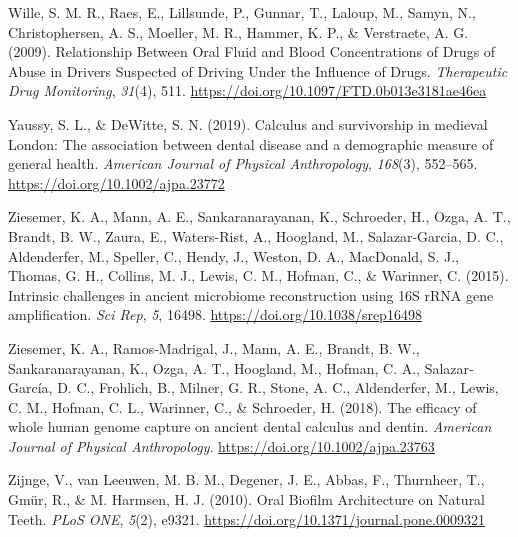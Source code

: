 \documentclass[
]{article}
\newlength{\cslhangindent}
\newlength{\cslentryspacingunit} %
\newenvironment{CSLReferences}[2] %
 {%
  \setlength{\parindent}{0pt}
  \ifodd #1
  \let\oldpar\par
  \def\par{\hangindent=\cslhangindent\oldpar}
  \fi
  \setlength{\parskip}{#2\cslentryspacingunit}
 }%
 {}
\begin{document}
\begin{CSLReferences}{1}{0}
\leavevmode{}%
Wille, S. M. R., Raes, E., Lillsunde, P., Gunnar, T., Laloup, M., Samyn,
N., Christophersen, A. S., Moeller, M. R., Hammer, K. P., \& Verstraete,
A. G. (2009). Relationship {Between Oral Fluid} and {Blood
Concentrations} of {Drugs} of {Abuse} in {Drivers Suspected} of {Driving
Under} the {Influence} of {Drugs}. \emph{Therapeutic Drug Monitoring},
\emph{31}(4), 511. \url{https://doi.org/10.1097/FTD.0b013e3181ae46ea}

\leavevmode{}%
Yaussy, S. L., \& DeWitte, S. N. (2019). Calculus and survivorship in
medieval {London}: {The} association between dental disease and a
demographic measure of general health. \emph{American Journal of
Physical Anthropology}, \emph{168}(3), 552--565.
\url{https://doi.org/10.1002/ajpa.23772}

\leavevmode{}%
Ziesemer, K. A., Mann, A. E., Sankaranarayanan, K., Schroeder, H., Ozga,
A. T., Brandt, B. W., Zaura, E., Waters-Rist, A., Hoogland, M.,
Salazar-Garcia, D. C., Aldenderfer, M., Speller, C., Hendy, J., Weston,
D. A., MacDonald, S. J., Thomas, G. H., Collins, M. J., Lewis, C. M.,
Hofman, C., \& Warinner, C. (2015). Intrinsic challenges in ancient
microbiome reconstruction using {16S rRNA} gene amplification. \emph{Sci
Rep}, \emph{5}, 16498. \url{https://doi.org/10.1038/srep16498}

\leavevmode{}%
Ziesemer, K. A., Ramos‐Madrigal, J., Mann, A. E., Brandt, B. W.,
Sankaranarayanan, K., Ozga, A. T., Hoogland, M., Hofman, C. A.,
Salazar‐García, D. C., Frohlich, B., Milner, G. R., Stone, A. C.,
Aldenderfer, M., Lewis, C. M., Hofman, C. L., Warinner, C., \&
Schroeder, H. (2018). The efficacy of whole human genome capture on
ancient dental calculus and dentin. \emph{American Journal of Physical
Anthropology}. \url{https://doi.org/10.1002/ajpa.23763}

\leavevmode{}%
Zijnge, V., van Leeuwen, M. B. M., Degener, J. E., Abbas, F., Thurnheer,
T., Gmür, R., \& M. Harmsen, H. J. (2010). Oral {Biofilm Architecture}
on {Natural Teeth}. \emph{PLoS ONE}, \emph{5}(2), e9321.
\url{https://doi.org/10.1371/journal.pone.0009321}

\end{CSLReferences}
\end{document}
